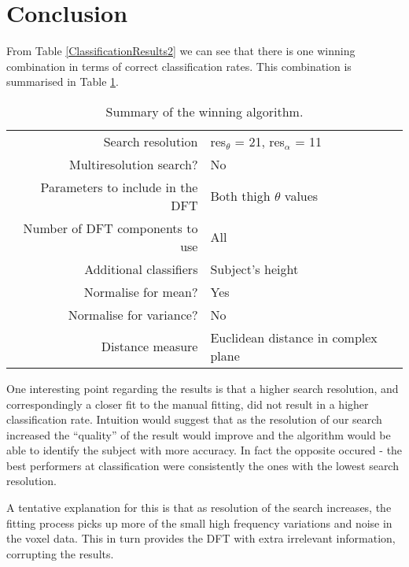 \section{Conclusion}

From Table \ref{ClassificationResults2} we can see that there is one winning combination in terms of correct classification rates.
This combination is summarised in Table \ref{ConclusionTable}.

\begin{table}[hb]
	\centering
	\begin{tabular}{r|l}
		Search resolution & res$_\theta$ = 21, res$_\alpha$ = 11 \\
		Multiresolution search? & No \\
		Parameters to include in the DFT & Both thigh $\theta$ values\\
		Number of DFT components to use & All \\
		Additional classifiers & Subject's height \\
		Normalise for mean? & Yes \\
		Normalise for variance? & No \\
		Distance measure & Euclidean distance in complex plane
	\end{tabular}
	\caption{Summary of the winning algorithm.}
	\label{ConclusionTable}
\end{table}

One interesting point regarding the results is that a higher search resolution, and correspondingly a closer fit to the manual fitting, did not result in a higher classification rate.
Intuition would suggest that as the resolution of our search increased the ``quality'' of the result would improve and the algorithm would be able to identify the subject with more accuracy.
In fact the opposite occured - the best performers at classification were consistently the ones with the lowest search resolution.

A tentative explanation for this is that as resolution of the search increases, the fitting process picks up more of the small high frequency variations and noise in the voxel data.
This in turn provides the DFT with extra irrelevant information, corrupting the results.
